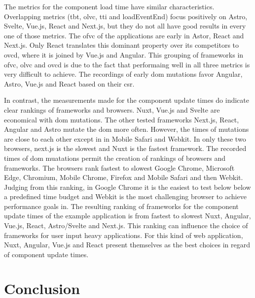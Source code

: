 \documentclass[a4paper, 12pt]{article}
\begin{document}
The metrics for the component load time have similar characteristics.
Overlapping metrics (\acrshort{tbt}, \acrshort{olvc}, \acrshort{tti} and loadEventEnd) focus positively on Astro, Svelte, Vue.js, React and Next.js, but they do not all have good results in every one of those metrics.
The \acrshort{ofvc} of the applications are early in Astor, React and Next.js.
Only React translates this dominant property over its competitors to \acrshort{ovcd}, where it is joined by Vue.js and Angular.
This grouping of frameworks in \acrshort{ofvc}, \acrshort{olvc} and \acrshort{ovcd} is due to the fact that performaing well in all three metrics is very difficult to achieve.
The recordings of early \acrshort{dom} mutations favor Angular, Astro, Vue.js and React based on their \acrshort{csr}.

In contrast, the measurements made for the component update times do indicate clear rankings of frameworks and browsers.
Nuxt, Vue.js and Svelte are economical with \acrshort{dom} mutations.
The other tested frameworks Next.js, React, Angular and Astro mutate the \acrshort{dom} more often.
However, the times of mutations are close to each other except in in Mobile Safari and Webkit.
In only these two browsers, next.js is the slowest and Nuxt is the fastest framework.
The recorded times of \acrshort{dom} muatations permit the creation of rankings of browsers and frameworks.
The browsers rank fastest to slowest Google Chrome, Microsoft Edge, Chromium, Mobile Chrome, Firefox and Mobile Safari and then Webkit.
Judging from this ranking, in Google Chrome it is the easiest to test below below a predefined time budget and Webkit is the most challenging browser to achieve performance goals in.
The resulting ranking of frameworks for the component update times of the example application is from fastest to slowest Nuxt, Angular, Vue.js, React, Astro/Svelte and Next.js.
This ranking can influence the choice of frameworks for user input heavy applications.
For this kind of web application, Nuxt, Angular, Vue.js and React present themselves as the best choices in regard of component update times.

\section{Conclusion}\label{sec:conclusion}
\end{document}
